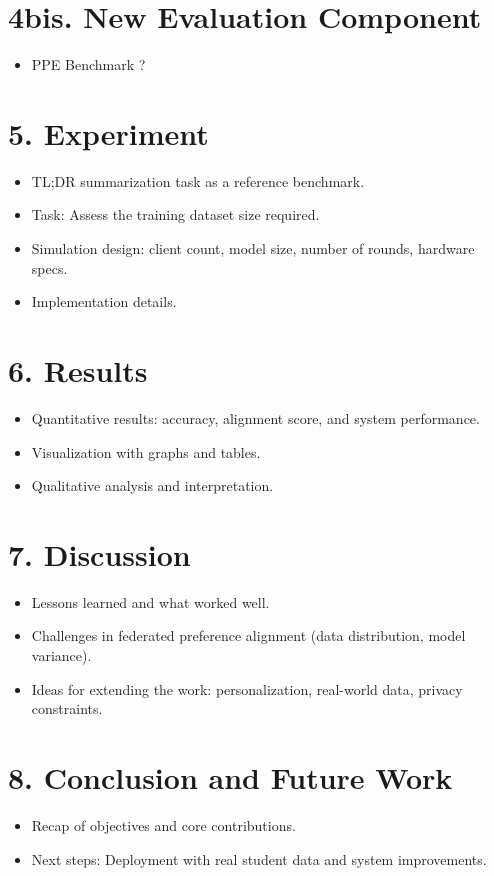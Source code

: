 \documentclass[headsepline,footsepline,footinclude=false,oneside,fontsize=10pt,paper=a4]{scrbook}
\begin{document}
\section*{4bis. New Evaluation Component}
\begin{itemize}[leftmargin=1.5em]
    \item PPE Benchmark ?
\end{itemize}

\section*{5. Experiment}
\begin{itemize}[leftmargin=1.5em]
    \item TL;DR summarization task as a reference benchmark.
    \item Task: Assess the training dataset size required.
    \item Simulation design: client count, model size, number of rounds, hardware specs.
    \item Implementation details.
\end{itemize}

\section*{6. Results}
\begin{itemize}[leftmargin=1.5em]
    \item Quantitative results: accuracy, alignment score, and system performance.
    \item Visualization with graphs and tables.
    \item Qualitative analysis and interpretation.
\end{itemize}

\section*{7. Discussion}
\begin{itemize}[leftmargin=1.5em]
    \item Lessons learned and what worked well.
    \item Challenges in federated preference alignment (data distribution, model variance).
    \item Ideas for extending the work: personalization, real-world data, privacy constraints.
\end{itemize}

\section*{8. Conclusion and Future Work}
\begin{itemize}[leftmargin=1.5em]
    \item Recap of objectives and core contributions.
    \item Next steps: Deployment with real student data and system improvements.
\end{itemize}
\end{document}
